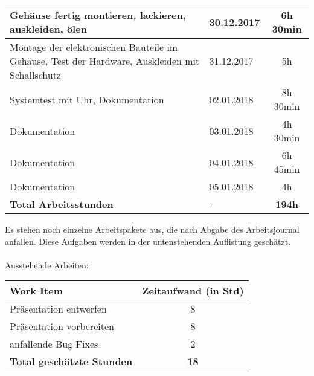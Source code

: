 \begin{longtable}{p{9cm}|p{2cm}|c}
		Gehäuse fertig montieren, lackieren, auskleiden, ölen & 30.12.2017 & 6h 30min  \\ \midrule
		Montage der elektronischen Bauteile im Gehäuse, Test der Hardware, Auskleiden mit Schallschutz & 31.12.2017 & 5h \\ \midrule
		Systemtest mit Uhr, Dokumentation & 02.01.2018 & 8h 30min \\ \midrule
		Dokumentation & 03.01.2018 & 4h 30min \\ \midrule
		Dokumentation & 04.01.2018 & 6h 45min \\ \midrule
		Dokumentation & 05.01.2018 & 4h \\ \midrule
		\textbf{Total Arbeitsstunden}
		&
            -
            &
		\textbf{194h}\\\midrule\bottomrule
	\end{longtable}

\clearpage
\noindent Es stehen noch einzelne Arbeitspakete aus, die nach Abgabe des Arbeitsjournal anfallen. Diese Aufgaben werden in der untenstehenden Auflistung geschätzt.\\
\\
Ausstehende Arbeiten:\\
\begin{tabular}{p{9cm}|c}
    \textbf{Work Item}     & \textbf{Zeitaufwand (in Std)} \\\hline
    Präsentation entwerfen & 8\\
    Präsentation vorbereiten & 8 \\
    anfallende Bug Fixes   & 2\\ \midrule
    \textbf{Total geschätzte Stunden} & \textbf{18}\\ \midrule\bottomrule
\end{tabular}